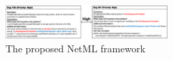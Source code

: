 \begin{figure}[!t]
\centering
\includegraphics[width=0.55\textwidth]{bug_high_crop}
\caption{The proposed NetML framework}
\label{fig:bug_high}
\end{figure}